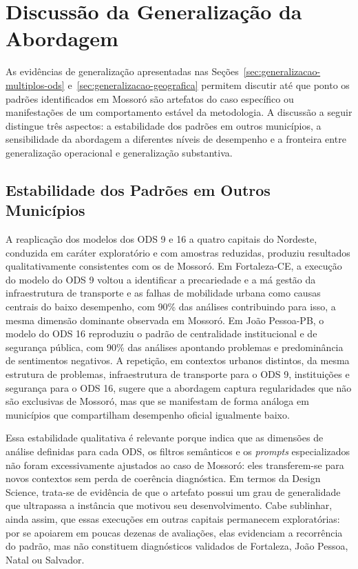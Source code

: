 \section{Discussão da Generalização da Abordagem}
\label{sec:disc-generalizacao}

As evidências de generalização apresentadas nas Seções~\ref{sec:generalizacao-multiplos-ods} e~\ref{sec:generalizacao-geografica} permitem discutir até que ponto os padrões identificados em Mossoró são artefatos do caso específico ou manifestações de um comportamento estável da metodologia. A discussão a seguir distingue três aspectos: a estabilidade dos padrões em outros municípios, a sensibilidade da abordagem a diferentes níveis de desempenho e a fronteira entre generalização operacional e generalização substantiva.

\subsection{Estabilidade dos Padrões em Outros Municípios}
\label{subsec:disc-estabilidade}

A reaplicação dos modelos dos ODS 9 e 16 a quatro capitais do Nordeste, conduzida em caráter exploratório e com amostras reduzidas, produziu resultados qualitativamente consistentes com os de Mossoró. Em Fortaleza-CE, a execução do modelo do ODS 9 voltou a identificar a precariedade e a má gestão da infraestrutura de transporte e as falhas de mobilidade urbana como causas centrais do baixo desempenho, com 90\% das análises contribuindo para isso, a mesma dimensão dominante observada em Mossoró. Em João Pessoa-PB, o modelo do ODS 16 reproduziu o padrão de centralidade institucional e de segurança pública, com 90\% das análises apontando problemas e predominância de sentimentos negativos. A repetição, em contextos urbanos distintos, da mesma estrutura de problemas, infraestrutura de transporte para o ODS 9, instituições e segurança para o ODS 16, sugere que a abordagem captura regularidades que não são exclusivas de Mossoró, mas que se manifestam de forma análoga em municípios que compartilham desempenho oficial igualmente baixo.

Essa estabilidade qualitativa é relevante porque indica que as dimensões de análise definidas para cada ODS, os filtros semânticos e os \textit{prompts} especializados não foram excessivamente ajustados ao caso de Mossoró: eles transferem-se para novos contextos sem perda de coerência diagnóstica. Em termos da Design Science, trata-se de evidência de que o artefato possui um grau de generalidade que ultrapassa a instância que motivou seu desenvolvimento. Cabe sublinhar, ainda assim, que essas execuções em outras capitais permanecem exploratórias: por se apoiarem em poucas dezenas de avaliações, elas evidenciam a recorrência do padrão, mas não constituem diagnósticos validados de Fortaleza, João Pessoa, Natal ou Salvador.

